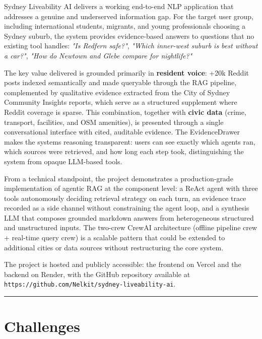 \documentclass[11pt,a4paper]{article}
\newcommand{\passthrough}[1]{#1}
\begin{document}
Sydney Liveability AI delivers a working end-to-end NLP application that addresses a genuine and underserved information gap. For the target user group, including international students, migrants, and young professionals choosing a Sydney suburb, the system provides evidence-based answers to questions that no existing tool handles: \emph{"Is Redfern safe?"}, \emph{"Which inner-west suburb is best without a car?"}, \emph{"How do Newtown and Glebe compare for nightlife?"}

The key value delivered is grounded primarily in \textbf{resident voice}: +20k Reddit posts indexed semantically and made queryable through the RAG pipeline, complemented by qualitative evidence extracted from the City of Sydney Community Insights reports, which serve as a structured supplement where Reddit coverage is sparse. This combination, together with \textbf{civic data} (crime, transport, facilities, and OSM amenities), is presented through a single conversational interface with cited, auditable evidence. The EvidenceDrawer makes the system\textquotesingle s reasoning transparent: users can see exactly which agents ran, which sources were retrieved, and how long each step took, distinguishing the system from opaque LLM-based tools.

From a technical standpoint, the project demonstrates a production-grade implementation of agentic RAG at the component level: a ReAct agent with three tools autonomously deciding retrieval strategy on each turn, an evidence trace recorded as a side channel without constraining the agent loop, and a synthesis LLM that composes grounded markdown answers from heterogeneous structured and unstructured inputs. The two-crew CrewAI architecture (offline pipeline crew + real-time query crew) is a scalable pattern that could be extended to additional cities or data sources without restructuring the core system.

The project is hosted and publicly accessible: the frontend on Vercel and the backend on Render, with the GitHub repository available at \passthrough{\lstinline!https://github.com/Nelkit/sydney-liveability-ai!}.

\begin{center}\rule{0.5\linewidth}{0.5pt}\end{center}

\section{Challenges}\label{challenges}
\end{document}
